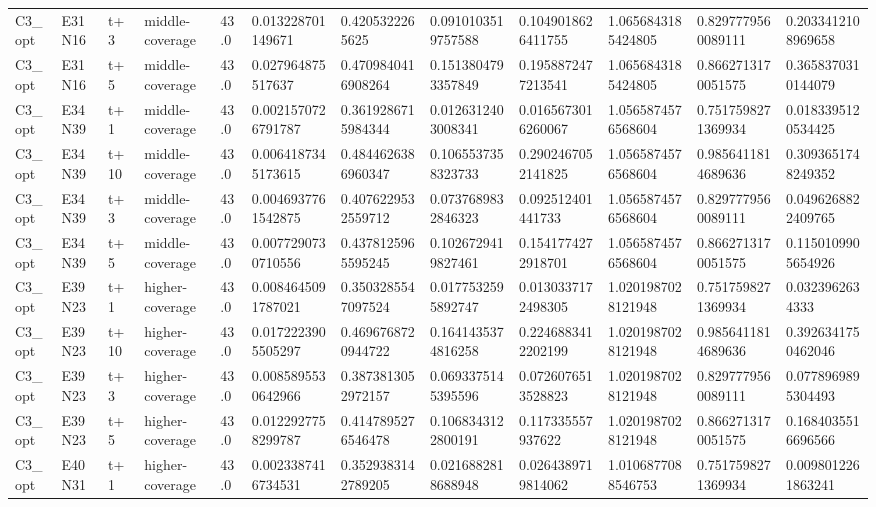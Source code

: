 \begin{landscape}
\begin{longtable}{llllllllllll}
C3\_opt & E31N16 & t+3 & middle-coverage & 43.0 & 0.013228701149671 & 0.4205322265625 & 0.0910103519757588 & 0.1049018626411755 & 1.0656843185424805 & 0.8297779560089111 & 0.2033412108969658 \\
C3\_opt & E31N16 & t+5 & middle-coverage & 43.0 & 0.027964875517637 & 0.4709840416908264 & 0.1513804793357849 & 0.1958872477213541 & 1.0656843185424805 & 0.8662713170051575 & 0.3658370310144079 \\
C3\_opt & E34N39 & t+1 & middle-coverage & 43.0 & 0.0021570726791787 & 0.3619286715984344 & 0.0126312403008341 & 0.0165673016260067 & 1.0565874576568604 & 0.7517598271369934 & 0.0183395120534425 \\
C3\_opt & E34N39 & t+10 & middle-coverage & 43.0 & 0.0064187345173615 & 0.4844626386960347 & 0.1065537358323733 & 0.2902467052141825 & 1.0565874576568604 & 0.9856411814689636 & 0.3093651748249352 \\
C3\_opt & E34N39 & t+3 & middle-coverage & 43.0 & 0.0046937761542875 & 0.4076229532559712 & 0.0737689832846323 & 0.092512401441733 & 1.0565874576568604 & 0.8297779560089111 & 0.0496268822409765 \\
C3\_opt & E34N39 & t+5 & middle-coverage & 43.0 & 0.0077290730710556 & 0.4378125965595245 & 0.1026729419827461 & 0.1541774272918701 & 1.0565874576568604 & 0.8662713170051575 & 0.1150109905654926 \\
C3\_opt & E39N23 & t+1 & higher-coverage & 43.0 & 0.0084645091787021 & 0.3503285547097524 & 0.0177532595892747 & 0.0130337172498305 & 1.0201987028121948 & 0.7517598271369934 & 0.0323962634333 \\
C3\_opt & E39N23 & t+10 & higher-coverage & 43.0 & 0.0172223905505297 & 0.4696768720944722 & 0.1641435374816258 & 0.2246883412202199 & 1.0201987028121948 & 0.9856411814689636 & 0.3926341750462046 \\
C3\_opt & E39N23 & t+3 & higher-coverage & 43.0 & 0.0085895530642966 & 0.3873813052972157 & 0.0693375145395596 & 0.0726076513528823 & 1.0201987028121948 & 0.8297779560089111 & 0.0778969895304493 \\
C3\_opt & E39N23 & t+5 & higher-coverage & 43.0 & 0.0122927758299787 & 0.4147895276546478 & 0.1068343122800191 & 0.117335557937622 & 1.0201987028121948 & 0.8662713170051575 & 0.1684035516696566 \\
C3\_opt & E40N31 & t+1 & higher-coverage & 43.0 & 0.0023387416734531 & 0.3529383142789205 & 0.0216882818688948 & 0.0264389719814062 & 1.0106877088546753 & 0.7517598271369934 & 0.0098012261863241 \\

\end{longtable}
\end{landscape}
